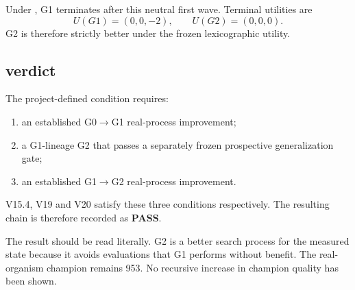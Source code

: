 Under , G1 terminates after this neutral first wave. Terminal utilities are
\[
U(G1)=(0,0,-2), \qquad U(G2)=(0,0,0).
\]
G2 is therefore strictly better under the frozen lexicographic utility.

\subsection{\lthreep verdict}

The project-defined \lthreep condition requires:
\begin{enumerate}
  \item an established G0$\rightarrow$G1 real-process improvement;
  \item a G1-lineage G2 that passes a separately frozen prospective generalization gate;
  \item an established G1$\rightarrow$G2 real-process improvement.
\end{enumerate}

V15.4, V19 and V20 satisfy these three conditions respectively. The resulting chain is therefore recorded as \textbf{\lthreep PASS}.

The result should be read literally. G2 is a better search process for the measured state because it avoids evaluations that G1 performs without benefit. The real-organism champion remains 953. No recursive increase in champion quality has been shown.
